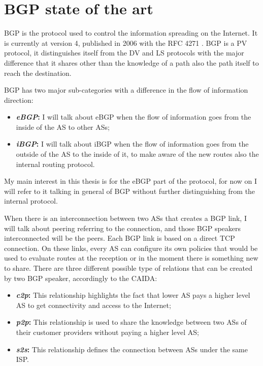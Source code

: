 \chapter{BGP state of the art}
\label{cha:bgp_art}

\ac{BGP} is the protocol used to control the information spreading on the Internet.
It is currently at version \num{4}, published in \num{2006} with the \ac{RFC} \num{4271}
\cite{rfc4271}.
\ac{BGP} is a \ac{PV} protocol, it distinguishes itself from the \ac{DV} and \ac{LS}
protocols with the major difference that it shares other than the knowledge of
a path also the path itself to reach the destination.

\ac{BGP} has two major sub-categories with a difference in the flow of information
direction:
\begin{itemize}
	\item \textbf{\textit{\ac{eBGP}}:} I will talk about \ac{eBGP} when the
		flow of information goes from the inside
		of the \ac{AS} to other \acp{AS};
	\item \textbf{\textit{\ac{iBGP}}:} I will talk about \ac{iBGP} when the flow
		of information goes from the outside of the \ac{AS} to the inside of
		it, to make aware of the new routes also the internal routing protocol.
\end{itemize}

My main interest in this thesis is for the \ac{eBGP} part of the protocol, for
now on I will refer to it talking in general of \ac{BGP} without further distinguishing
from the internal protocol.

When there is an interconnection between two \acp{AS} that creates a \ac{BGP}
link, I will talk about peering referring to the connection, and those \ac{BGP}
speakers interconnected will be the peers.
Each \ac{BGP} link is based on a direct \ac{TCP} connection.
On these links, every \ac{AS} can configure its own policies that would be used
to evaluate routes at the reception or in the moment there is something new
to share.
There are three different possible type of relations that can be created by two
\ac{BGP} speaker, accordingly to the \ac{CAIDA}:

\begin{itemize}
	\item \textbf{\textit{\ac{c2p}}:} This relationship highlights the fact that
		lower \ac{AS} pays a higher level \ac{AS} to get connectivity and access
		to the Internet;
	\item \textbf{\textit{\ac{p2p}}:} This relationship is used to share the knowledge
		between two \acp{AS} of their customer providers without paying a higher
		level \ac{AS};
	\item \textbf{\textit{\ac{s2s}}:} This relationship defines the connection
		between \acp{AS} under the same \ac{ISP}.
\end{itemize}

